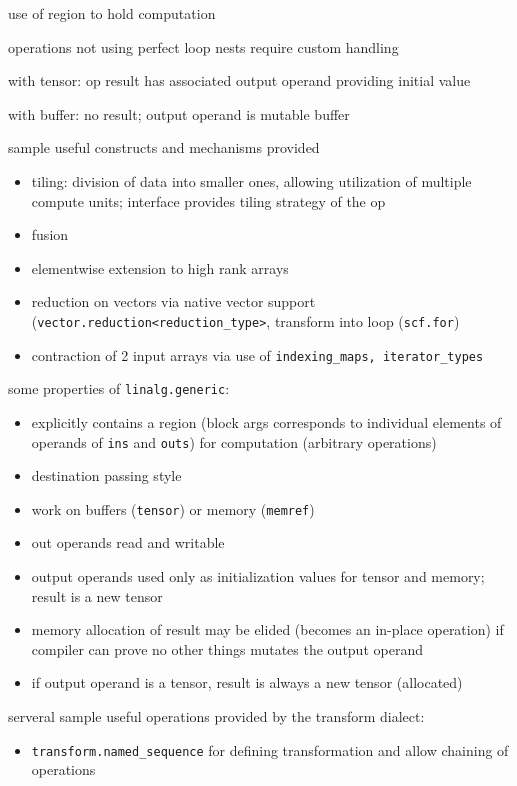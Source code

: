 \documentclass[8pt]{extarticle}
\begin{document}
\begin{multicols*}{2}
use of region to hold computation

operations not using perfect loop nests require custom handling

with tensor: op result has associated output operand providing initial value

with buffer: no result; output operand is mutable buffer

sample useful constructs and mechanisms provided
\begin{itemize}
\item tiling: division of data into smaller ones, allowing utilization of multiple compute units; interface provides tiling strategy of the op
\item fusion
\item elementwise extension to high rank arrays
\item reduction on vectors via native vector support (\verb|vector.reduction<reduction_type>|, transform into loop (\verb|scf.for|)
\item contraction of 2 input arrays via use of \verb|indexing_maps, iterator_types|
\end{itemize}

some properties of \verb|linalg.generic|:
\begin{itemize}
\item explicitly contains a region (block args corresponds to individual elements of operands of \verb|ins| and \verb|outs|) for computation (arbitrary operations)
\item destination passing style
\item work on buffers (\verb|tensor|) or memory (\verb|memref|)
\item out operands read and writable
\item output operands used only as initialization values for tensor and memory; result is a new tensor
\item memory allocation of result may be elided (becomes an in-place operation) if compiler can prove no other things mutates the output operand
\item if output operand is a tensor, result is always a new tensor (allocated)
\end{itemize}

serveral sample useful operations provided by the transform dialect:
\begin{itemize}
\item \verb|transform.named_sequence| for defining transformation and allow chaining of operations
\end{itemize}


\end{multicols*}
\end{document}
